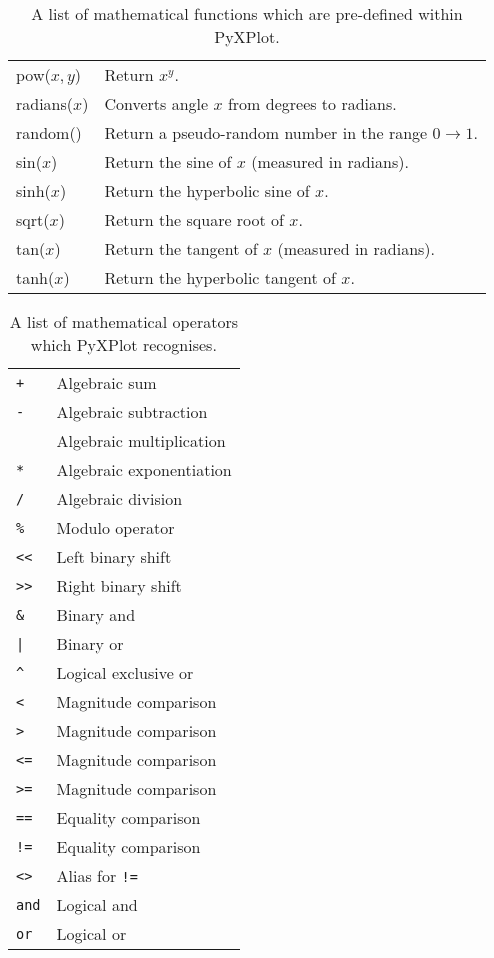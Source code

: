 \begin{table}
\begin{longtable}{|lp{8cm}|}
pow($x,y$)&
Return $x^y$.\\
radians($x$)&
Converts angle $x$ from degrees to radians.\\
random()&
Return a pseudo-random number in the range $0\to1$.\\
sin($x$)&
Return the sine of $x$ (measured in radians).\\
sinh($x$)&
Return the hyperbolic sine of $x$.\\
sqrt($x$)&
Return the square root of $x$.\\
tan($x$)&
Return the tangent of $x$ (measured in radians).\\
tanh($x$)&
Return the hyperbolic tangent of $x$.\\
\hline
\end{longtable}
\caption{A list of mathematical functions which are pre-defined within PyXPlot.}
\label{functions_table}
\end{table}

\begin{table}
\begin{longtable}{|lp{8cm}|}
\hline
{\tt +} & Algebraic sum \\
{\tt -} & Algebraic subtraction \\
{\tt *} & Algebraic multiplication \\
{\tt **} & Algebraic exponentiation \\
{\tt /} & Algebraic division \\
{\tt \%} & Modulo operator \\
{\tt <<} & Left binary shift \\
{\tt >>} & Right binary shift \\
{\tt \&} & Binary and \\
{\tt |} & Binary or \\
{\tt \^{}} & Logical exclusive or \\
{\tt <} & Magnitude comparison \\
{\tt >} & Magnitude comparison \\
{\tt <=} & Magnitude comparison \\
{\tt >=} & Magnitude comparison \\
{\tt ==} & Equality comparison \\
{\tt !=} & Equality comparison \\
{\tt <>} & Alias for {\tt !=} \\
{\tt and} & Logical and \\
{\tt or} & Logical or \\
\hline
\end{longtable}
\caption{A list of mathematical operators which PyXPlot recognises.}
\label{operators_table}
\end{table}

